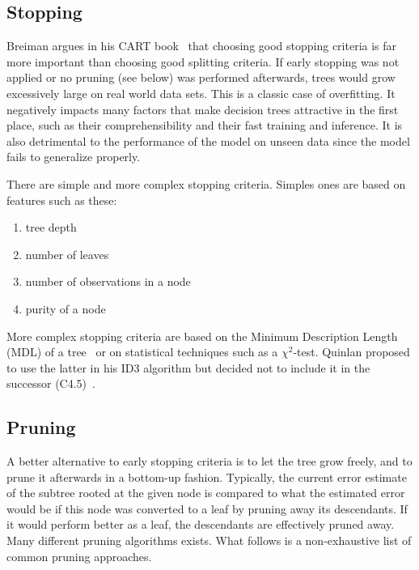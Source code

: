 \subsection{Stopping}
Breiman argues in his CART book~\cite{cart} that choosing good stopping criteria is far more important than choosing good splitting criteria. If early stopping was not applied or no pruning (see below) was performed afterwards, trees would grow excessively large on real world data sets. This is a classic case of overfitting. It negatively impacts many factors that make decision trees attractive in the first place, such as their comprehensibility and their fast training and inference. It is also detrimental to the performance of the model on unseen data since the model fails to generalize properly.

There are simple and more complex stopping criteria. Simples ones are based on features such as these:
\begin{enumerate}
    \item tree depth
    \item number of leaves
    \item number of observations in a node
    \item purity of a node
\end{enumerate}

More complex stopping criteria are based on the Minimum Description Length (MDL) of a tree~\cite{mdlstopping} or on statistical techniques such as a $\chi^2$-test. Quinlan proposed to use the latter in his ID3 algorithm but decided not to include it in the successor (C4.5)~\cite{id3ter, c45}.

\subsection{Pruning}
A better alternative to early stopping criteria is to let the tree grow freely, and to prune it afterwards in a bottom-up fashion. Typically, the current error estimate of the subtree rooted at the given node is compared to what the estimated error would be if this node was converted to a leaf by pruning away its descendants. If it would perform better as a leaf, the descendants are effectively pruned away. Many different pruning algorithms exists. What follows is a non-exhaustive list of common pruning approaches.

